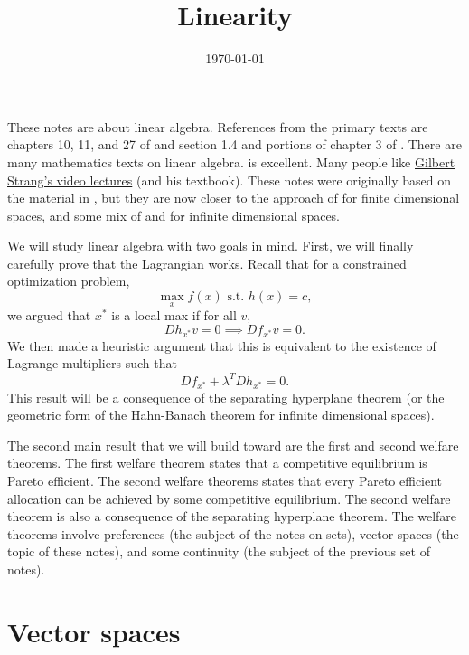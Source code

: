  


\title{Linearity}
\date{\today}



\maketitle

These notes are about linear algebra. References from the primary
texts are chapters 10, 11, and 27 of \cite{sb1994} and section 1.4 and
portions of chapter 3 of \cite{carter2001}. There are many mathematics
texts on linear algebra.  \cite{axler1997} is excellent. Many people
like
\href{http://ocw.mit.edu/courses/mathematics/18-06-linear-algebra-spring-2010/video-lectures/}
{Gilbert Strang's video lectures} (and his textbook). These notes were
originally based on the material in \cite{sb1994}, but they are now
closer to the approach of \cite{axler1997} for finite dimensional
spaces, and some mix of \cite{luenberger1969} and \cite{clarke2013}
for infinite dimensional spaces. 

We will study linear algebra with two goals in mind. First, we will
finally carefully prove that the Lagrangian works. Recall that for a
constrained optimization problem, 
\[ \max_x f(x) \text{ s.t.  } h(x) = c, \]
we argued that $x^*$ is a local max if for all $v$, 
\[ Dh_{x^*} v = 0 \implies Df_{x^*} v = 0. \] 
We then made a heuristic argument that this is equivalent to the
existence of Lagrange multipliers such that 
\[ Df_{x^*} + \lambda^T Dh_{x^*} = 0. \]
This result will be a consequence of the separating hyperplane theorem
(or the geometric form of the Hahn-Banach theorem for infinite
dimensional spaces).

The second main result that we will build toward are the first and
second welfare theorems. The first welfare theorem states that a
competitive equilibrium is Pareto efficient. The second welfare
theorems states that every Pareto efficient allocation can be achieved
by some competitive equilibrium. The second welfare theorem is also a
consequence of the separating hyperplane theorem. The welfare theorems
involve preferences (the subject of the notes on sets), vector spaces
(the topic of these notes), and some continuity (the subject of the
previous set of notes).

\section{Vector spaces}

